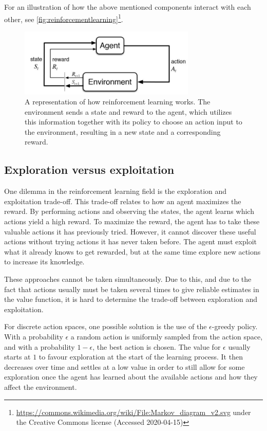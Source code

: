\documentclass{kththesis}
\begin{document}
For an illustration of how the above mentioned components interact with each other, see \autoref{fig:reinforcementlearning}\footnote{\url{https://commons.wikimedia.org/wiki/File:Markov_diagram_v2.svg} under the Creative Commons license (Accessed 2020-04-15)}.

\begin{figure}
\centering
\includegraphics[width=0.75\textwidth]{reinforcement-learning.jpg}
\caption{A representation of how reinforcement learning works. The environment sends a state and reward to the agent, which utilizes this information together with its policy to choose an action input to the environment, resulting in a new state and a corresponding reward.}
\label{fig:reinforcementlearning}
\end{figure}

\subsection{Exploration versus exploitation}
\label{subsec:explorevsexploit}
One dilemma in the reinforcement learning field is the exploration and exploitation trade-off. This trade-off relates to how an agent maximizes the reward. By performing actions and observing the states, the agent learns which actions yield a high reward. To maximize the reward, the agent has to take these valuable actions it has previously tried. However, it cannot discover these useful actions without trying actions it has never taken before. The agent must exploit what it already knows to get rewarded, but at the same time explore new actions to increase its knowledge.

These approaches cannot be taken simultaneously. Due to this, and due to the fact that actions usually must be taken several times to give reliable estimates in the value function, it is hard to determine the trade-off between exploration and exploitation.

For discrete action spaces, one possible solution is the use of the $\epsilon$-greedy policy. With a probability $\epsilon$ a random action is uniformly sampled from the action space, and with a probability $1 - \epsilon$, the best action is chosen. The value for $\epsilon$ usually starts at $1$ to favour exploration at the start of the learning process. It then decreases over time and settles at a low value in order to still allow for some exploration once the agent has learned about the available actions and how they affect the environment. \parencite{sutton1998introduction}
\end{document}
